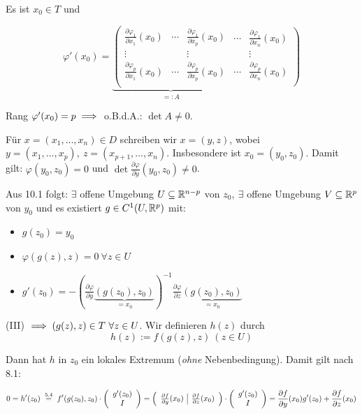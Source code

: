 \documentclass[a4paper,twoside,DIV15,BCOR12mm]{scrbook}
\begin{document}
\begin{beweis}
Es ist $x_0 \in T$ und

$$\varphi'(x_0) = 
\underbrace{
\left(
\begin{array}{ccc|}
\frac{\partial \varphi_1}{\partial x_1}(x_0) & \cdots & \frac{\partial \varphi_1}{\partial x_p}(x_0)\\
\vdots &  & \vdots\\
\frac{\partial \varphi_p}{\partial x_1}(x_0) & \cdots & \frac{\partial \varphi_p}{\partial x_p}(x_0)\\
\end{array}
\right.
}_{=:A}
\left.
\begin{array}{cc}
\cdots & \frac{\partial \varphi_1}{\partial x_n}(x_0)\\
 & \vdots\\
\cdots & \frac{\partial \varphi_p}{\partial x_n}(x_0)\\
\end{array}
\right)$$

Rang $\varphi'(x_0) = p \implies$ o.B.d.A.: $\det A \ne 0.$

Für $x=(x_1,\ldots,x_n) \in D$ schreiben wir $x=(y,z)$, wobei $y=(x_1,\dots,x_p),\ z=(x_{p+1},\ldots,x_n).$ Insbesondere ist $x_0=(y_0,z_0)$. Damit gilt: $\varphi(y_0,z_0) = 0$ und $\det \frac{\partial \varphi}{\partial y}(y_0,z_0) \ne 0$.

Aus 10.1 folgt: $\exists$ offene Umgebung $U \subseteq \mathbb{R}^{n-p}$ von $z_0,\ \exists$ offene Umgebung $V \subseteq \mathbb{R}^p$ von $y_0$ und es existiert $g \in C^1(U,\mathbb{R}^p)$ mit:

\begin{itemize}
\item[(II)] $g(z_0)=y_0$
\item[(III)] $\varphi(g(z),z) = 0\ \forall z \in U$
\item[(IV)] $g'(z_0) = -(\frac{\partial \varphi}{\partial y}\underbrace{(g(z_0),z_0)}_{=x_0})^{-1}\frac{\partial \varphi}{\partial z}\underbrace{(g(z_0),z_0)}_{=x_0}$
\end{itemize}

(III) $\implies (g(z),z) \in T\ \forall z \in U$. Wir definieren $h(z)$ durch
$$h(z) := f(g(z),z)\ (z \in U)$$

Dann hat $h$ in $z_0$ ein lokales Extremum (\emph{ohne} Nebenbedingung). Damit gilt nach 8.1:

$$0=h'(z_0) \gleichnach{5.4} f'(g(z_0),z_0)\cdot\left(
\begin{array}{c}
g'(z_0)\\
I
\end{array}\right) = \left(
\begin{array}{c|c}
\frac{\partial f}{\partial y}(x_0) & \frac{\partial f}{\partial z}(x_0)
\end{array}\right) \cdot \left(
\begin{array}{c}
g'(z_0)\\
I
\end{array}\right) = \frac{\partial f}{\partial y}(x_0) g'(z_0) + \frac{\partial f}{\partial z}(x_0)$$


\end{beweis}
\end{document}
